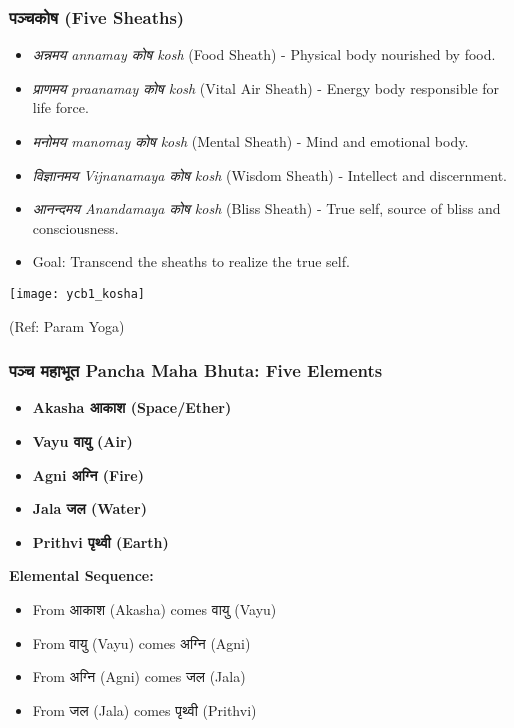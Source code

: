 \begin{frame}[fragile]\frametitle{पञ्चकोष   (Five Sheaths)}

      \begin{itemize}
		\item \textit{अन्नमय  annamay कोष  kosh} (Food Sheath) - Physical body nourished by food.
		\item \textit{प्राणमय  praanamay  कोष  kosh} (Vital Air Sheath) - Energy body responsible for life force.
		\item \textit{मनोमय  manomay कोष kosh } (Mental Sheath) - Mind and emotional body.
		\item \textit{विज्ञानमय Vijnanamaya कोष  kosh} (Wisdom Sheath) - Intellect and discernment.
		\item \textit{आनन्दमय Anandamaya कोष  kosh} (Bliss Sheath) - True self, source of bliss and consciousness.
		\item Goal: Transcend the sheaths to realize the true self.
	  \end{itemize}

      \begin{center}
        \texttt{[image: ycb1\_kosha]}

		{\tiny (Ref: Param Yoga)}		
        \end{center}
\end{frame}

\begin{frame}[fragile]\frametitle{पञ्च  महाभूत  Pancha Maha Bhuta: Five Elements}


    \begin{itemize}
        \item \textbf{Akasha आकाश  (Space/Ether)}
        \item \textbf{Vayu वायु  (Air)}
        \item \textbf{Agni अग्नि (Fire)}
        \item \textbf{Jala जल (Water)}
        \item \textbf{Prithvi पृथ्वी (Earth)}
    \end{itemize}
	
    \textbf{Elemental Sequence:}
	
    \begin{itemize}
        \item From आकाश (Akasha) comes वायु (Vayu)
        \item From वायु (Vayu) comes अग्नि (Agni)
        \item From अग्नि (Agni) comes जल (Jala)
        \item From जल (Jala) comes पृथ्वी (Prithvi)
    \end{itemize}
	
\end{frame}

